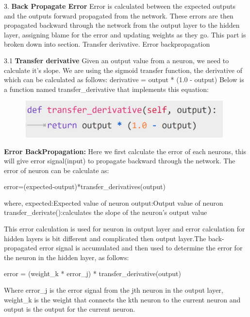 {3. \textbf{Back Propagate Error}\newline
Error is calculated between the expected outputs and the outputs forward propagated from the network. These errors are then propagated backward through the network from the output layer to the hidden layer, assigning blame for the error and updating weights as they go.\newline
 This part is broken down into section. Transfer derivative. Error backpropagation
 
 3.1 \textbf{Transfer derivative}\newline
 Given an output value from a neuron, we need to calculate it’s slope. We are using the sigmoid transfer function, the derivative of which can be calculated as follows:\newline
        derivative = output * (1.0 - output)\newline
 Below is a function named transfer\_derivative that implements this equation:
 \begin{figure}[H]
\begin{center}
\includegraphics[width=110mm,height=20mm]{backexplain/transferDerivative.jpg}
\end{center}
\end{figure} 

 \textbf{Error BackPropagation:}\newline
Here we first calculate the error of each neurons, this will give error signal(input) to propagate backward through the network.\newline
The error of neuron can be calculate as:\newline
 \centerline{error=(expected-output)*transfer\_derivatives(output)}
where,\newline
expected:Expected value of neuron \newline 
output:Output value of neuron\newline
transfer\_derivate():calculates the slope of the neuron’s output value

This error calculation is used for neuron in output layer and error calculation for hidden layers is bit different and complicated then output layer.\newline The back-propagated error signal is accumulated and then used to determine the error for the neuron in the hidden layer, as follows:\newline
           \centerline{error = (weight\_k * error\_j) * transfer\_derivative(output)}
Where error\_j is the error signal from the jth neuron in the output layer, weight\_k is the weight that connects the kth neuron to the current neuron and output is the output for the current neuron.

}
